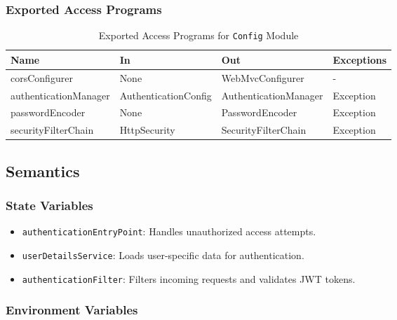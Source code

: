 \documentclass[12pt, titlepage]{article}
\begin{document}
\subsubsection{Exported Access Programs}
\label{sec:ConfigModuleExported}

\begin{table}[h!]
\centering
\begin{tabular}{|l|l|l|l|}
\hline
\textbf{Name}         & \textbf{In}           & \textbf{Out}             & \textbf{Exceptions} \\ \hline
corsConfigurer        & None                  & WebMvcConfigurer         & -                  \\ \hline
authenticationManager  & AuthenticationConfig  & AuthenticationManager    & Exception          \\ \hline
passwordEncoder       & None                  & PasswordEncoder          & Exception          \\ \hline
securityFilterChain    & HttpSecurity          & SecurityFilterChain      & Exception          \\ \hline
\end{tabular}
\caption{Exported Access Programs for \texttt{Config} Module}
\end{table}

\subsection{Semantics}
\label{sec:ConfigModuleSemantics}

\subsubsection{State Variables}
\label{sec:ConfigModuleStateVariables}

\begin{itemize}
    \item \texttt{authenticationEntryPoint}: Handles unauthorized access attempts.
    \item \texttt{userDetailsService}: Loads user-specific data for authentication.
    \item \texttt{authenticationFilter}: Filters incoming requests and validates JWT tokens.
\end{itemize}

\subsubsection{Environment Variables}
\label{sec:ConfigModuleEnvVariables}
\end{document}
